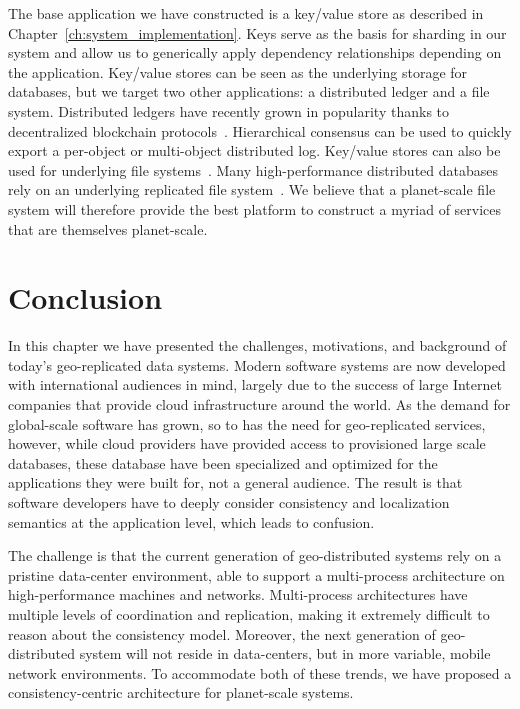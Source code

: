 The base application we have constructed is a key/value store as described in Chapter~\ref{ch:system_implementation}.
Keys serve as the basis for sharding in our system and allow us to generically apply dependency relationships depending on the application.
Key/value stores can be seen as the underlying storage for databases, but we target two other applications: a distributed ledger and a file system.
Distributed ledgers have recently grown in popularity thanks to decentralized blockchain protocols~\cite{fruitchains}.
Hierarchical consensus can be used to quickly export a per-object or multi-object distributed log.
Key/value stores can also be used for underlying file systems~\cite{s3}.
Many high-performance distributed databases rely on an underlying replicated file system~\cite{aurora,btrdb,bigtable,megastore,spanner}.
We believe that a planet-scale file system will therefore provide the best platform to construct a myriad of services that are themselves planet-scale.

\section{Conclusion}
\label{ch02_conclusion}

In this chapter we have presented the challenges, motivations, and background of today's geo-replicated data systems.
Modern software systems are now developed with international audiences in mind, largely due to the success of large Internet companies that provide cloud infrastructure around the world.
As the demand for global-scale software has grown, so to has the need for geo-replicated services, however, while cloud providers have provided access to provisioned large scale databases, these database have been specialized and optimized for the applications they were built for, not a general audience.
The result is that software developers have to deeply consider consistency and localization semantics at the application level, which leads to confusion.

The challenge is that the current generation of geo-distributed systems rely on a pristine data-center environment, able to support a multi-process architecture on high-performance machines and networks.
Multi-process architectures have multiple levels of coordination and replication, making it extremely difficult to reason about the consistency model.
Moreover, the next generation of geo-distributed system will not reside in data-centers, but in more variable, mobile network environments.
To accommodate both of these trends, we have proposed a consistency-centric architecture for planet-scale systems.

